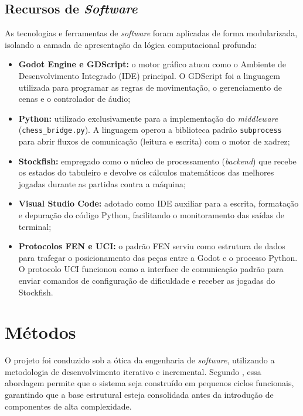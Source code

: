 \subsection{Recursos de \textit{Software}}

As tecnologias e ferramentas de \textit{software} foram aplicadas de forma modularizada, isolando a camada de apresentação da lógica computacional profunda:

\begin{itemize}
	\item \textbf{Godot Engine e GDScript:} o motor gráfico atuou como o Ambiente de Desenvolvimento Integrado (IDE) principal. O GDScript foi a linguagem utilizada para programar as regras de movimentação, o gerenciamento de cenas e o controlador de áudio;
	\item \textbf{Python:} utilizado exclusivamente para a implementação do \textit{middleware} (\texttt{chess\_bridge.py}). A linguagem operou a biblioteca padrão \texttt{subprocess} para abrir fluxos de comunicação (leitura e escrita) com o motor de xadrez;
	\item \textbf{Stockfish:} empregado como o núcleo de processamento (\textit{backend}) que recebe os estados do tabuleiro e devolve os cálculos matemáticos das melhores jogadas durante as partidas contra a máquina;
	\item \textbf{Visual Studio Code:} adotado como IDE auxiliar para a escrita, formatação e depuração do código Python, facilitando o monitoramento das saídas de terminal;
	\item \textbf{Protocolos FEN e UCI:} o padrão FEN serviu como estrutura de dados para trafegar o posicionamento das peças entre a Godot e o processo Python. O protocolo UCI funcionou como a interface de comunicação padrão para enviar comandos de configuração de dificuldade e receber as jogadas do Stockfish.
\end{itemize}

\section{Métodos}
\label{secao:metodos}

O projeto foi conduzido sob a ótica da engenharia de \textit{software}, utilizando a metodologia de desenvolvimento iterativo e incremental. Segundo , essa abordagem permite que o sistema seja construído em pequenos ciclos funcionais, garantindo que a base estrutural esteja consolidada antes da introdução de componentes de alta complexidade.

